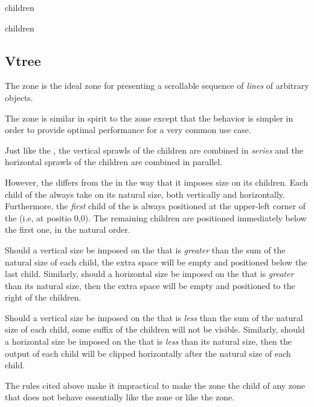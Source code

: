 
 {children}

 {\rest children}

\subsection{Vtree}
\label{sec-zones-layout-vtree}

The  zone is the ideal zone for presenting a scrollable
sequence of \emph{lines} of arbitrary objects.

The  zone is similar in spirit to the  zone
 except that the behavior is simpler in
order to provide optimal performance for a very common use case.

Just like the , the vertical sprawls of the children are
combined in \emph{series} and the horizontal sprawls of the children
are combined in parallel.  

However, the  differs from the  in the way that
it imposes size on its children.  Each child of the 
always take on its natural size, both vertically and horizontally.
Furthermore, the \emph{first} child of the  is always
positioned at the upper-left corner of the  (i.e, at
positio 0,0).  The remaining children are positioned immediately below
the first one, in the natural order.  

Should a vertical size be imposed on the  that is
\emph{greater} than the sum of the natural size of each child, the
extra space will be empty and positioned below the last child.
Similarly, should a horizontal size be imposed on the 
that is \emph{greater} than its natural size, then the extra space
will be empty and positioned to the right of the children.

Should a vertical size be imposed on the  that is
\emph{less} than the sum of the natural size of each child, some
suffix of the children will not be visible.  Similarly, should a
horizontal size be imposed on the  that is \emph{less}
than its natural size, then the output of each child will be clipped
horizontally after the natural size of each child. 

The rules cited above make it impractical to make the 
zone the child of any zone that does not behave essentially like the
 zone or like the  zone.

